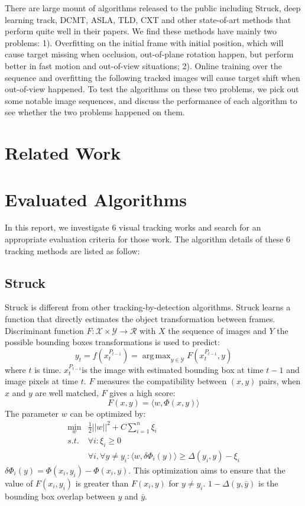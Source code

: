 \documentclass{acm_proc_article-sp}
\DeclareMathOperator*{\argmax}{arg\,max}
\DeclareMathOperator*{\minbelow}{min}
\begin{document}
There are large mount of algorithms released to the public including Struck\cite{struck}, deep learning track\cite{dlt}, DCMT\cite{dcmt}, ASLA\cite{asla}, TLD\cite{tld}, CXT\cite{cxt} and other state-of-art methods that perform quite well in their papers. 
We find these methods have mainly two problems: 
1). Overfitting on the initial frame with initial position, which will cause target missing when occlusion, out-of-plane rotation happen, but perform better in fast motion and out-of-view situations;
2). Online training over the sequence and overfitting the following tracked images will cause target shift when out-of-view happened.
To test the algorithms on these two problems, we pick out some notable image sequences, and discuss the performance of each algorithm to see whether the two problems happened on them.

\section{Related Work}


\section{Evaluated Algorithms}
In this report, we investigate 6 visual tracking works and search for an appropriate evaluation criteria for those work. The algorithm details of these 6 tracking methods are listed as follow:

\subsection{Struck}
Struck\cite{struck} is different from other tracking-by-detection algorithms. Struck learns a function that directly estimates the object transformation between frames. Discriminant function $F:\mathcal{X} \times \mathcal{Y} \to \mathcal{R}$ with $X$ the sequence of images and $Y$ the possible bounding boxes transformations is used to predict:
\[
y_t = f(x_t^{P_{t-1}}) = \argmax_{y\in \mathcal{Y}}F(x_t^{P_{t-1}},y)
\]
where $t$ is time. $x_t^{P_{t-1}}$is the image with estimated bounding box at time $t-1$ and image pixels at time $t$. $F$ measures the compatibility between $(x,y)$ pairs, when $x$ and $y$ are well matched, $F$ gives a high score:
\[
F(x,y)=\langle w, \Phi(x,y) \rangle
\]
The parameter $w$ can be optimized by:
\begin{align}
\minbelow_w	&\frac{1}{2}||w||^2 + C \sum_{i=1}^n\xi_i\nonumber\\
	s.t.	&\forall i: \xi_i \ge 0\nonumber\\
			&\forall i, \forall y\not= y_i : \langle w, \delta\Phi_i(y)\rangle \ge \Delta(y_i,y)-\xi_i
\end{align}
$\delta\Phi_i(y)=\Phi(x_i, y_i) - \Phi(x_i, y)$. This optimization aims to ensure that the value of $F(x_i, y_i)$ is greater than $F(x_i, y)$ for $y\not= y_i$. $1-\Delta(y,\bar{y})$ is the bounding box overlap between $y$ and $\bar{y}$.
\end{document}
